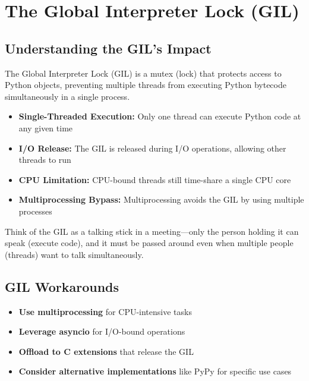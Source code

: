 \documentclass[12pt,letterpaper]{article}
\begin{document}
\section{The Global Interpreter Lock (GIL)}

\subsection{Understanding the GIL's Impact}

The Global Interpreter Lock (GIL) is a mutex (lock) that protects access to Python objects, preventing multiple threads from executing Python bytecode simultaneously in a single process.

\begin{itemize}
    \item \textbf{\textcolor{pythonBlue}{Single-Threaded Execution:}} Only one thread can execute Python code at any given time
    \item \textbf{\textcolor{pythonBlue}{I/O Release:}} The GIL is released during I/O operations, allowing other threads to run
    \item \textbf{\textcolor{pythonBlue}{CPU Limitation:}} CPU-bound threads still time-share a single CPU core
    \item \textbf{\textcolor{pythonBlue}{Multiprocessing Bypass:}} Multiprocessing avoids the GIL by using multiple processes
\end{itemize}

Think of the GIL as a talking stick in a meeting—only the person holding it can speak (execute code), and it must be passed around even when multiple people (threads) want to talk simultaneously.

\subsection{GIL Workarounds}

\begin{itemize}
    \item \textbf{\textcolor{pythonBlue}{Use multiprocessing}} for CPU-intensive tasks
    \item \textbf{\textcolor{pythonBlue}{Leverage asyncio}} for I/O-bound operations
    \item \textbf{\textcolor{pythonBlue}{Offload to C extensions}} that release the GIL
    \item \textbf{\textcolor{pythonBlue}{Consider alternative implementations}} like PyPy for specific use cases
\end{itemize}
\end{document}
